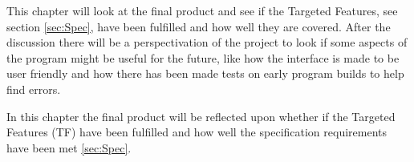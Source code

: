 This chapter will look at the final product and see if the Targeted Features, see section \ref{sec:Spec}, have been fulfilled and how well they are covered. After the discussion there will be a perspectivation of the project to look if some aspects of the program might be useful for the future, like how the interface is made to be user friendly and how there has been made tests on early program builds to help find errors.

In this chapter the final product will be reflected upon whether if the Targeted Features (TF) have been fulfilled and how well the specification requirements have been met \ref{sec:Spec}.